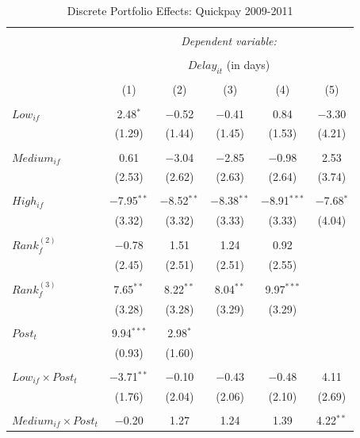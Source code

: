 \documentclass[
]{article}
\begin{document}
\begin{table}[H] \centering 
  \caption{Discrete Portfolio Effects: Quickpay 2009-2011} 
  \label{} 
\small 
\begin{tabular}{@{\extracolsep{-2pt}}lccccc} 
\\[-1.8ex]\hline 
\hline \\[-1.8ex] 
 & \multicolumn{5}{c}{\textit{Dependent variable:}} \\ 
\cline{2-6} 
\\[-1.8ex] & \multicolumn{5}{c}{$Delay_{it}$ (in days)} \\ 
\\[-1.8ex] & (1) & (2) & (3) & (4) & (5)\\ 
\hline \\[-1.8ex] 
 $Low_{if}$ & 2.48$^{*}$ & $-$0.52 & $-$0.41 & 0.84 & $-$3.30 \\ 
  & (1.29) & (1.44) & (1.45) & (1.53) & (4.21) \\ 
  & & & & & \\ 
 $Medium_{if}$ & 0.61 & $-$3.04 & $-$2.85 & $-$0.98 & 2.53 \\ 
  & (2.53) & (2.62) & (2.63) & (2.64) & (3.74) \\ 
  & & & & & \\ 
 $High_{if}$ & $-$7.95$^{**}$ & $-$8.52$^{**}$ & $-$8.38$^{**}$ & $-$8.91$^{***}$ & $-$7.68$^{*}$ \\ 
  & (3.32) & (3.32) & (3.33) & (3.33) & (4.04) \\ 
  & & & & & \\ 
 $Rank_f^{(2)}$ & $-$0.78 & 1.51 & 1.24 & 0.92 &  \\ 
  & (2.45) & (2.51) & (2.51) & (2.55) &  \\ 
  & & & & & \\ 
 $Rank_f^{(3)}$ & 7.65$^{**}$ & 8.22$^{**}$ & 8.04$^{**}$ & 9.97$^{***}$ &  \\ 
  & (3.28) & (3.28) & (3.29) & (3.29) &  \\ 
  & & & & & \\ 
 $Post_t$ & 9.94$^{***}$ & 2.98$^{*}$ &  &  &  \\ 
  & (0.93) & (1.60) &  &  &  \\ 
  & & & & & \\ 
 $Low_{if} \times Post_t$ & $-$3.71$^{**}$ & $-$0.10 & $-$0.43 & $-$0.48 & 4.11 \\ 
  & (1.76) & (2.04) & (2.06) & (2.10) & (2.69) \\ 
  & & & & & \\ 
 $Medium_{if} \times Post_t$ & $-$0.20 & 1.27 & 1.24 & 1.39 & 4.22$^{**}$ \\ 

\end{tabular}
\end{table}
\end{document}
